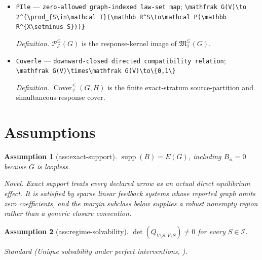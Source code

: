 \documentclass{article}
\newtheorem{assumption}{Assumption}
\begin{document}
\begin{itemize}
  \item \texttt{PIle} --- \texttt{zero-\allowbreak{}allowed graph-\allowbreak{}indexed law-\allowbreak{}set map}; \texttt{\textbackslash{}\allowbreak{}mathfrak G(V)\textbackslash{}\allowbreak{}to 2\textasciicircum{}\{\textbackslash{}\allowbreak{}prod\_\allowbreak{}\{S\textbackslash{}\allowbreak{}in\textbackslash{}\allowbreak{}mathcal I\}\allowbreak{}(\textbackslash{}\allowbreak{}mathbb R\textasciicircum{}S\textbackslash{}\allowbreak{}to\textbackslash{}\allowbreak{}mathcal P(\textbackslash{}\allowbreak{}mathbb R\textasciicircum{}\{X\textbackslash{}\allowbreak{}setminus S\}\allowbreak{}))\}\allowbreak{}}
  \par\smallskip\noindent\emph{Definition.} \(\mathcal P^{\le}_{\mathcal I}(G)\) is the response-kernel image of \(\mathfrak M^{\le}_{\mathcal I}(G)\).
  \item \texttt{Coverle} --- \texttt{downward-\allowbreak{}closed directed compatibility relation}; \texttt{\textbackslash{}\allowbreak{}mathfrak G(V)\textbackslash{}\allowbreak{}times\textbackslash{}\allowbreak{}mathfrak G(V)\textbackslash{}\allowbreak{}to\textbackslash{}\allowbreak{}\{0,\allowbreak{}1\textbackslash{}\allowbreak{}\}\allowbreak{}}
  \par\smallskip\noindent\emph{Definition.} \(\operatorname{Cover}^{\le}_{\mathcal I}(G,H)\) is the finite exact-stratum source-partition and simultaneous-response cover.
\end{itemize}

\section{Assumptions}

\begin{assumption}[ass:exact-support]\label{ass:exact-support}
\(\operatorname{supp}(B)=E(G)\), including \(B_{ii}=0\) because \(G\) is loopless.
\par\smallskip\noindent\emph{Novel.} Exact support treats every declared arrow as an actual direct equilibrium effect. It is satisfied by sparse linear feedback systems whose reported graph omits zero coefficients, and the margin subclass below supplies a robust nonempty region rather than a generic closure convention.
\end{assumption}

\begin{assumption}[ass:regime-solvability]\label{ass:regime-solvability}
\(\det(Q_{V\setminus S,V\setminus S})\ne0\) for every \(S\in\mathcal I\).
\par\smallskip\noindent\emph{Standard} (Unique solvability under perfect interventions, \cite{BongersForrePetersMooij2021}).
\end{assumption}
\end{document}
